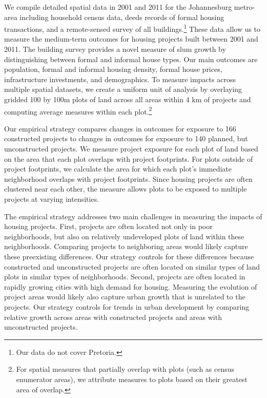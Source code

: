 \documentclass[12pt]{article}
\newcommand{\rv}{}
\begin{document}
\rv{We compile detailed spatial data in 2001 and 2011 for the Johannesburg metro-area including household census data, deeds records of formal housing transactions, and a remote-sensed survey of all buildings.\footnote{\rv{Our data do not cover Pretoria.}}  These data allow us to measure the medium-term outcomes for housing projects built between 2001 and 2011.   The building survey provides a novel measure of slum growth by distinguishing between formal and informal house types.  Our main outcomes are population, formal and informal housing density, formal house prices, infrastructure investments, and demographics.} To measure impacts across multiple spatial datasets, we create a uniform unit of analysis by overlaying gridded 100 by 100m plots of land across all areas within 4 km of projects and computing average measures within each plot.\footnote{For spatial measures that partially overlap with plots (such as census enumerator areas), we attribute measures to plots based on their greatest area of overlap.} 

Our empirical strategy compares changes in outcomes for exposure to 166 constructed projects to changes in outcomes for exposure to 140 planned, but unconstructed projects.  \rv{We measure project exposure for each plot of land based on the area that each plot overlaps with project footprints.  For plots outside of project footprints, we calculate the area for which each plot's immediate neighborhood overlaps with project footprints.  Since housing projects are often clustered near each other, the measure allows plots to be exposed to multiple projects at varying intensities.}  

\rv{The empirical strategy addresses two main challenges in measuring the impacts of housing projects.  First, projects are often located not only in poor neighborhoods, but also on relatively undeveloped plots of land within these neighborhoods.  Comparing projects to neighboring areas would likely capture these preexisting differences.  Our strategy controls for these differences because constructed and unconstructed projects are often located on similar types of land plots in similar types of neighborhoods.  Second, projects are often located in rapidly growing cities with high demand for housing.  Measuring the evolution of project areas would likely also capture urban growth that is unrelated to the projects.  Our strategy controls for trends in urban development by comparing relative growth across areas with constructed projects and areas with unconstructed projects.}
\end{document}
